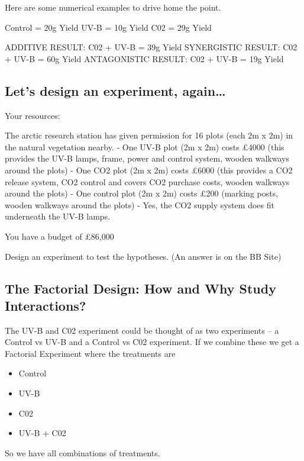 \documentclass[
]{book}
\providecommand{\tightlist}{%
  \setlength{\itemsep}{0pt}\setlength{\parskip}{0pt}}
\begin{document}
Here are some numerical examples to drive home the point.

Control = 20g Yield
UV-B = 10g Yield
C02 = 29g Yield

ADDITIVE RESULT: C02 + UV-B = 39g Yield
SYNERGISTIC RESULT: C02 + UV-B = 60g Yield
ANTAGONISTIC RESULT: C02 + UV-B = 19g Yield

\hypertarget{lets-design-an-experiment-again}{%
\subsection{Let's design an experiment, again\ldots{}}\label{lets-design-an-experiment-again}}

Your resources:

The arctic research station has given permission for 16 plots (each 2m x 2m) in the natural vegetation nearby.
- One UV-B plot (2m x 2m) costs £4000 (this provides the UV-B lamps, frame, power and control system, wooden walkways around the plots)
- One CO2 plot (2m x 2m) costs £6000 (this provides a CO2 release system, CO2 control and covers CO2 purchase costs, wooden walkways around the plots)
- One control plot (2m x 2m) costs £200 (marking posts, wooden walkways around the plots)
- Yes, the CO2 supply system does fit underneath the UV-B lamps.

You have a budget of £86,000

Design an experiment to test the hypotheses. (An answer is on the BB Site)

\hypertarget{the-factorial-design-how-and-why-study-interactions}{%
\subsection{The Factorial Design: How and Why Study Interactions?}\label{the-factorial-design-how-and-why-study-interactions}}

The UV-B and C02 experiment could be thought of as two experiments -- a Control vs UV-B and a Control vs C02 experiment. If we combine these we get a Factorial Experiment where the treatments are

\begin{itemize}
\tightlist
\item
  Control
\item
  UV-B
\item
  C02
\item
  UV-B + C02
\end{itemize}

So we have all combinations of treatments.
\end{document}
